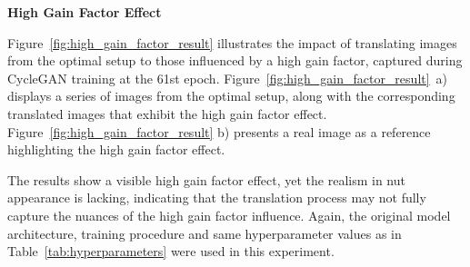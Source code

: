 \documentclass[12pt,DIV14,BCOR12mm,a4paper,footinclude=false,headinclude,parskip=half-,twoside,openright,cleardoublepage=empty,toc=index,bibliography=totoc,listof=totoc]{scrreprt}
\numberwithin{equation}{chapter}
\begin{document}
\textbf{High Gain Factor Effect}

Figure~\ref{fig:high_gain_factor_result} illustrates the impact of translating images from the optimal setup to those influenced by a high gain factor, captured during CycleGAN training at the 61st epoch. Figure~\ref{fig:high_gain_factor_result}~a) displays a series of images from the optimal setup, along with the corresponding translated images that exhibit the high gain factor effect. Figure~\ref{fig:high_gain_factor_result} b) presents a real image as a reference highlighting the high gain factor effect. 

The results show a visible high gain factor effect, yet the realism in nut appearance is lacking, indicating that the translation process may not fully capture the nuances of the high gain factor influence. Again, the original model architecture, training procedure and same hyperparameter values as in Table~\ref{tab:hyperparameters} were used in this experiment.
\end{document}
